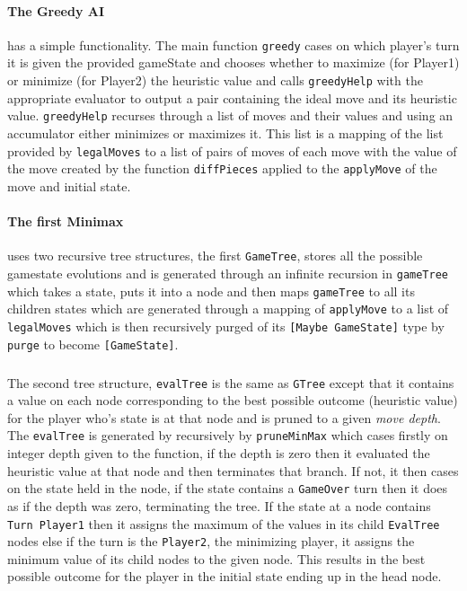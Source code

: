 \documentclass[11pt]{article}
\begin{document}
\paragraph{The Greedy AI} has a simple functionality. The main function \verb|greedy| cases on which player's turn it is given the provided gameState and chooses whether to maximize (for Player1) or minimize (for Player2) the heuristic value and calls \verb|greedyHelp| with the appropriate evaluator to output a pair containing the ideal move and its heuristic value. \verb|greedyHelp| recurses through a list of moves and their values and using an accumulator either minimizes or maximizes it. This list is a mapping of the list provided by \verb|legalMoves| to a list of pairs of moves of each move with the value of the move created by the function \verb|diffPieces| applied to the \verb|applyMove| of the move and initial state.

\paragraph{The first Minimax} uses two recursive tree structures, the first \verb|GameTree|, stores all the possible gamestate evolutions and is generated through an infinite recursion in \verb|gameTree| which takes a state, puts it into a node and then maps \verb|gameTree| to all its children states which are generated through a mapping of \verb|applyMove| to a list of \verb|legalMoves| which is then recursively purged of its \verb|[Maybe GameState]| type by \verb|purge| to become \verb|[GameState]|.

\subparagraph*{}The second tree structure, \verb|evalTree| is the same as \verb|GTree| except that it contains a value on each node corresponding to the best possible outcome (heuristic value) for the player who's state is at that node and is pruned to a given \textit{move depth}. The \verb|evalTree| is generated by recursively by \verb|pruneMinMax| which cases firstly on integer depth given to the function, if the depth is zero then it evaluated the heuristic value at that node and then terminates that branch. If not, it then cases on the state held in the node, if the state contains a \verb|GameOver| turn then it does as if the depth was zero, terminating the tree. If the state at a node contains \verb|Turn Player1| then it assigns the maximum of the values in its child \verb|EvalTree| nodes else if the turn is the \verb|Player2|, the minimizing player, it assigns the minimum value of its child nodes to the given node. This results in the best possible outcome for the player in the initial state ending up in the head node.
\end{document}
